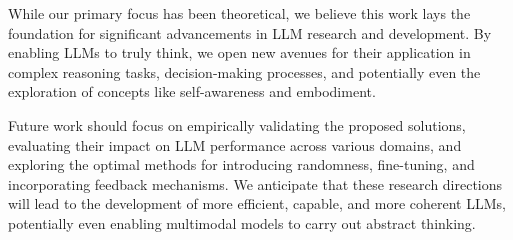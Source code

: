 \documentclass{article}
\begin{document}
While our primary focus has been theoretical, we believe this work lays the foundation for significant advancements in LLM research and development. By enabling LLMs to truly think, we open new avenues for their application in complex reasoning tasks, decision-making processes, and potentially even the exploration of concepts like self-awareness and embodiment.

Future work should focus on empirically validating the proposed solutions, evaluating their impact on LLM performance across various domains, and exploring the optimal methods for introducing randomness, fine-tuning, and incorporating feedback mechanisms. We anticipate that these research directions will lead to the development of more efficient, capable, and more coherent LLMs, potentially even enabling multimodal models to carry out abstract thinking.




\end{document}
